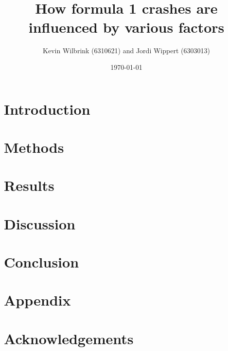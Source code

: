 \documentclass[12pt]{article}
\title{\textbf{How formula 1 crashes are influenced by various factors}}
\date{\today}
\author{Kevin Wilbrink (6310621) and Jordi Wippert (6303013)}
\begin{document}
	\maketitle

	\begin{multicols*}{2}
		\begin{abstract}
			\textbf{}
		\end{abstract}


		\section{Introduction}
		

		\section{Methods}
		

		\section{Results}
		

		\section{Discussion}
		

		\section{Conclusion}
		

		\section*{Appendix}
		

		\section*{Acknowledgements}
		

		
	\end{multicols*}
\end{document}
